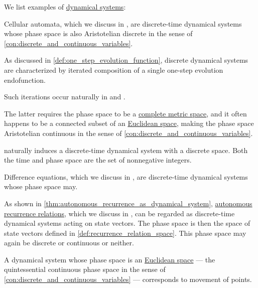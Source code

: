 \begin{example}\label{ex:def:dynamical_system}
  We list examples of \hyperref[def:dynamical_system]{dynamical systems}:
  \begin{thmenum}
     Cellular automata, which we discuss in , are discrete-time dynamical systems whose phase space is also Aristotelian discrete in the sense of \cref{con:discrete_and_continuous_variables}.

     As discussed in \cref{def:one_step_evolution_function}, discrete dynamical systems are characterized by iterated composition of a single one-step evolution endofunction.

    Such iterations occur naturally in  and .

    The latter requires the phase space to be a \hyperref[def:complete_metric_space]{complete metric space}, and it often happens to be a connected subset of an \hyperref[def:euclidean_plane]{Euclidean space}, making the phase space Aristotelian continuous in the sense of \cref{con:discrete_and_continuous_variables}.

      naturally induces a discrete-time dynamical system with a discrete space. Both the time and phase space are the set of nonnegative integers.

     Difference equations, which we discuss in , are discrete-time dynamical systems whose phase space may.

     As shown in \cref{thm:autonomous_recurrence_as_dynamical_system}, \hyperref[def:recurrence_relation/autonomous]{autonomous recurrence relations}, which we discuss in , can be regarded as discrete-time dynamical systems acting on state vectors. The phase space is then the space of state vectors defined in \cref{def:recurrence_relation_space}. This phase space may again be discrete or continuous or neither.

     A dynamical system whose phase space is an \hyperref[def:euclidean_plane]{Euclidean space} --- the quintessential continuous phase space in the sense of \cref{con:discrete_and_continuous_variables} --- corresponds to movement of points.


\end{thmenum}
\end{example}
